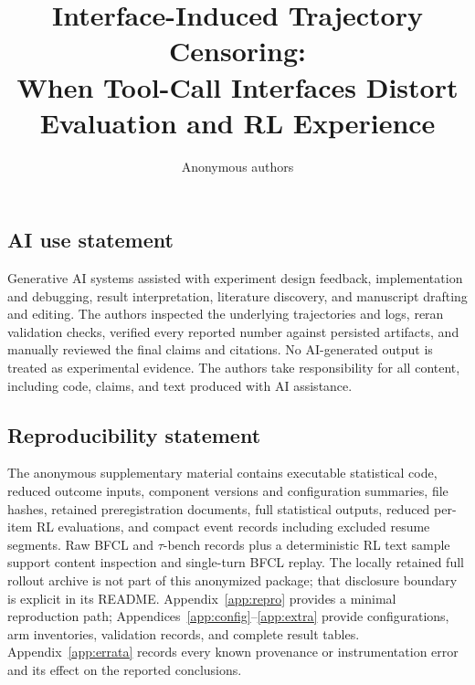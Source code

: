 \documentclass{article}
\title{Interface-Induced Trajectory Censoring:\\
When Tool-Call Interfaces Distort Evaluation and RL Experience}
\author{Anonymous authors}
\begin{document}
\maketitle

\begin{abstract}

\end{abstract}



\subsection*{AI use statement}
Generative AI systems assisted with experiment design feedback, implementation and debugging,
result interpretation, literature discovery, and manuscript drafting and editing. The authors
inspected the underlying trajectories and logs, reran validation checks, verified every reported
number against persisted artifacts, and manually reviewed the final claims and citations. No
AI-generated output is treated as experimental evidence. The authors take responsibility for all
content, including code, claims, and text produced with AI assistance.

\subsection*{Reproducibility statement}
The anonymous supplementary material contains executable statistical code, reduced outcome inputs,
component versions and configuration summaries, file hashes, retained preregistration documents,
full statistical outputs, reduced per-item RL evaluations, and compact event records including
excluded resume segments. Raw BFCL and $\tau$-bench records plus a deterministic RL text sample
support content inspection and single-turn BFCL replay. The locally
retained full rollout archive is not part of this anonymized package; that disclosure boundary
is explicit in its README. Appendix~\ref{app:repro}
provides a minimal reproduction path; Appendices~\ref{app:config}--\ref{app:extra} provide configurations,
arm inventories, validation records, and complete result tables. Appendix~\ref{app:errata} records every
known provenance or instrumentation error and its effect on the reported conclusions.




\appendix









\end{document}
